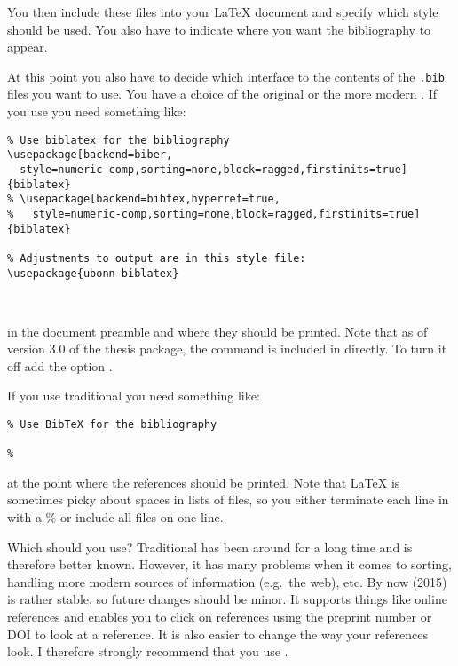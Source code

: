 You then include these files into your \LaTeX{} document and
specify which style should be used.
You also have to indicate where you want the bibliography to appear.

At this point you also have to decide which interface to the contents
of the \texttt{.bib} files you want to use. You have a choice of the
original \BibTeX{} or the more modern
. If you use  you
need something like:
\begin{verbatim}
% Use biblatex for the bibliography
\usepackage[backend=biber,
  style=numeric-comp,sorting=none,block=ragged,firstinits=true]{biblatex}
% \usepackage[backend=bibtex,hyperref=true,
%   style=numeric-comp,sorting=none,block=ragged,firstinits=true]{biblatex}

% Adjustments to output are in this style file:
\usepackage{ubonn-biblatex}



\end{verbatim}
in the document preamble and  where they
should be printed.
Note that as of version 3.0 of the thesis package,
the  command is included in  directly.
To turn it off add the option .
\par\noindent
If you use traditional \BibTeX{} you need something like:
\begin{verbatim}
% Use BibTeX for the bibliography

% 

\end{verbatim}
at the point where the references should be printed.
Note that \LaTeX{} is sometimes picky about spaces in lists of files,
so you either terminate each line in  with a \% or include all files on one line.

Which should you use? Traditional \BibTeX{} has been around for a long time and is
therefore better known. However, it has many problems when it comes to
sorting, handling more modern sources of information (e.g.\ the web),
etc. 
By now (2015)  is rather stable,
so future changes should be minor.
It supports things like online references and enables you to click on references
using the preprint number or DOI to look at a reference. It is also
easier to change the way your references look. I therefore
strongly recommend that you use .

